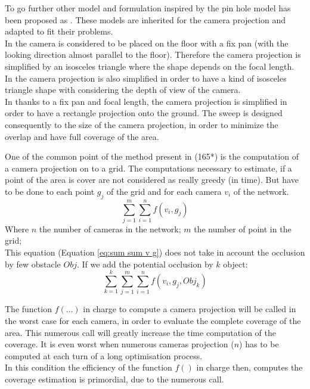 To go further other model and formulation inspired by the pin hole model has been proposed as \cite{87*morsly2012,141*akbarzadeh2013,146*li2011,194*fu2010}. These models are inherited for the camera projection and adapted to fit their problems. \\
In \cite{87*morsly2012,194*fu2010} the camera is considered to be placed on the floor with a fix pan (with the looking direction almost parallel to the floor). Therefore the camera projection is simplified by an isosceles triangle where the shape depends on the focal length.\\
In \citep{141*akbarzadeh2013} the camera projection is also simplified in order to have a kind of isosceles triangle shape with considering the depth of view of the camera.\\
In \citep{146*li2011} thanks to a fix pan and focal length, the camera projection is simplified in order to have a rectangle projection onto the ground. The sweep is designed consequently to the size of the camera projection, in order to minimize the overlap and have full coverage of the area.  


One of the common point of the method present in \cite{87*morsly2012,141*akbarzadeh2013,146*li2011,194*fu2010,22*zhao2008,33*reddy2012,193*fu2014,181*wang2017}  (165*) is the computation of a camera projection on to a grid. The computations necessary to estimate, if a point of the area is cover are not considered as really greedy (in time). But have to be done to each point $g_j$ of the grid and for each camera $v_i$ of the network.
	\begin{equation} \label{eq:sum sum v g}
		\sum_{j=1}^{m}\sum_{i=1}^{n}f( v_i,g_j)
	\end{equation}
Where $n$ the number of cameras in the network; $m$ the number of point in the grid; \\
This equation (Equation \ref{eq:sum sum v g}) does not take in account the occlusion by few obstacle $Obj$. If we add the potential occlusion by $k$ object: 
	\begin{equation}
		 \sum_{k=1}^{k}\sum_{j=1}^{m}\sum_{i=1}^{n}f( v_i,g_j,Obj_k)
	\end{equation} 
 
The function $f(...)$ in charge to compute a camera projection will be called in the worst case for each camera, in order to evaluate the complete coverage of the area. This numerous call will greatly increase the time computation of the coverage. It is even worst when numerous cameras projection ($n$) has to be computed at each turn of a long optimisation process.\\
In this condition the efficiency of the function $f()$ in charge then, computes the coverage estimation is primordial, due to the numerous call.




